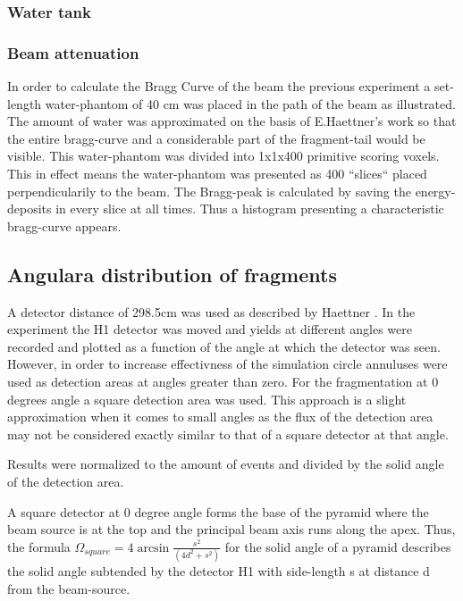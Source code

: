 \subsubsection{Water tank}


\subsubsection{Beam attenuation}

In order to calculate the Bragg Curve of the beam the previous experiment a set-length water-phantom of 40 cm was placed in the path of the beam as illustrated. The amount of water was approximated on the basis of E.Haettner's work so that the entire bragg-curve and a considerable part of the fragment-tail would be visible. This water-phantom was divided into 1x1x400 primitive scoring voxels. This in effect means the water-phantom was presented as 400 ``slices`` placed perpendicularily to the beam. The Bragg-peak is calculated by saving the energy-deposits in every slice at all times. Thus a histogram presenting a characteristic bragg-curve appears.

\subsection{Angulara distribution of fragments\label{AngularDistributionText}}


A detector distance of 298.5cm was used as described by Haettner \cite[fig 5.1]{ehaettner} . In the experiment the H1 detector was moved and yields at different angles were recorded and plotted as a function of the angle at which the detector was seen. However, in order to increase effectivness of the simulation circle annuluses were used as detection areas at angles greater than zero. For the fragmentation at 0 degrees angle a square detection area was used. This approach is a slight approximation when it comes to small angles as the flux of the detection area may not be considered exactly similar to that of a square detector at that angle.

Results were normalized to the amount of events and divided by the solid angle of the detection area.

A square detector at 0 degree angle forms the base of the pyramid where the beam source is at the top and the principal beam axis runs along the apex. Thus, the formula $\Omega_{square} = 4 \arcsin{\frac{s^2}{(4d^2+s^2)}}$ for the solid angle of a pyramid describes the solid angle subtended by the detector H1 with side-length s at distance d from the beam-source.

